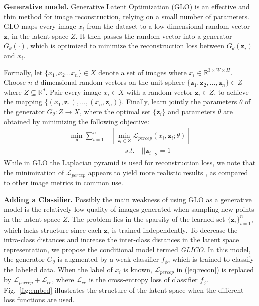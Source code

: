 \documentclass[a4paper,conference]{IEEEtran}
\newcommand{\bz}{{\mathbf z}}
\begin{document}
\textbf{Generative model.}
Generative Latent Optimization (GLO) 
is an effective and thin method for image reconstruction, relying on a small number of parameters. GLO maps every image $x_i$ from the dataset to a low-dimensional random vector $\bz_i$ in the latent space $Z$. It then passes the random vector into a generator $G_\theta( \cdot)$, which is optimized to minimize the reconstruction loss between $G_\theta(\bz_i)$ and $x_i$. 

Formally, let $\{x_1,x_2 \ldots x_n \} \in X$ denote a set of images where $x_i \in \mathbb{R}^{3 \times W \times H}$. Choose $n$ $d$-dimensional random vectors on the unit sphere $\{\bz_1,\bz_2, \ldots ,\bz_n \}\in Z$ where $Z  \subseteq \mathbb{R}^d$. Pair every image $x_i \in X$ with a random vector $\bz_i \in Z$, to achieve the mapping $\{(x_1,\bz_1), \dots, (x_n,\bz_n)\}$. Finally, learn jointly the parameters $\theta$ of the generator $G_\theta:Z \xrightarrow{} X$, where the optimal set $\{\bz_i\}$ and parameters $\theta$ are obtained by minimizing the following objective:
\begin{equation}
	\begin{split}
		\label{eq:recon}
		\min_{\theta} \sum_{i=1}^n &\left [ \min_{\bz_i\in Z} \mathcal{L}_{\textit{percep}}(x_i,\bz_i;\theta) \right ] \\
		& \quad\quad s.t. \quad ||\bz_i||_2=1
	\end{split}
\end{equation}
While in GLO the Laplacian pyramid is used for reconstruction loss, we note that the minimization of $\mathcal{L}_{\textit{percep}}$ appears to yield more realistic results \cite{glann}, as compared to other image metrics in common use.
		
\textbf{Adding a Classifier.}
Possibly the main weakness of using GLO as a generative model is the relatively low quality of images generated when sampling new points in the latent space $Z$. The problem lies in the sparsity of the learned set $\{\bz_i\}_{i=1}^n$, which lacks structure since each $\bz_i$ is trained independently. To decrease the intra-class distances and increase the inter-class distances in the latent space representation, we propose the conditional model termed \textit{GLICO}. In this model, the generator $G_\theta$ is augmented by a weak classifier $f_\phi$, which is trained to classify the labeled data. When the label of $x_i$ is known, $\mathcal{L}_{\textit{percep}}$ in (\ref{eq:recon}) is replaced by $\mathcal{L}_{\textit{percep}}+\mathcal{L}_{\textit{ce}}$, where $\mathcal{L}_{\textit{ce}}$ is the cross-entropy loss of classifier $f_\phi$. Fig.~\ref{fig:embed} illustrates the structure of the latent space when the different loss functions are used.
\end{document}
